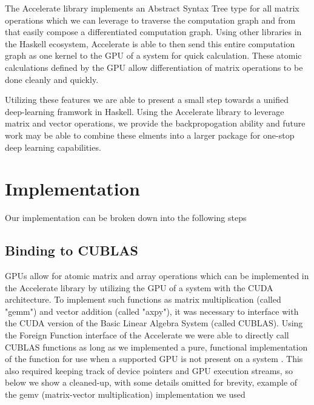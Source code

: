 \documentclass[prodmode,acmtecs]{acmsmall} %
\begin{document}
The Accelerate library implements an Abstract Syntax Tree type for all matrix operations
which we can leverage to traverse the computation graph and from that easily compose a
differentiated computation graph. Using other libraries in the Haskell ecosystem, Accelerate
is able to then send this entire computation graph as one kernel to the GPU of a system for
quick calculation. These atomic calculations defined by the GPU allow differentiation of
matrix operations to be done cleanly and quickly.

\smallskip

Utilizing these features we are able to present a small step towards a unified deep-learning
framwork in Haskell. Using the Accelerate library to leverage matrix and vector operations,
we provide the backpropogation ability and future work may be able to combine these elments
into a larger package for one-stop deep learning capabilities.

\section{Implementation}

Our implementation can be broken down into the following steps

\subsection{Binding to CUBLAS}

GPUs allow for atomic matrix and array operations which can be implemented in the Accelerate
library by utilizing the GPU of a system with the CUDA architecture. To implement such
functions as matrix multiplication (called "gemm") and vector addition (called "axpy"), it
was necessary to interface with the CUDA version of the Basic Linear Algebra System (called
CUBLAS). Using the Foreign Function interface of the Accelerate we were able to directly
call CUBLAS functions as long as we implemented a pure, functional implementation of the
function for use when a supported GPU is not present on a system \cite{clifton2014}.
This also required keeping track of device pointers and GPU execution streams,
so below we show a cleaned-up, with some details omitted for brevity, example of the gemv (matrix-vector multiplication) implementation we used
\end{document}
